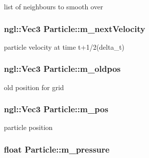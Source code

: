 list of neighbours to smooth over \hypertarget{classParticle_ad27e14ae4bd99b1975413f6881d8aea1}{
\subsubsection[{m\_\-nextVelocity}]{\setlength{\rightskip}{0pt plus 5cm}ngl::Vec3 {\bf Particle::m\_\-nextVelocity}}}
\label{classParticle_ad27e14ae4bd99b1975413f6881d8aea1}


particle velocity at time t+1/2(delta\_\-t) \hypertarget{classParticle_a4dcb620999acae9e32fa55ad39250c57}{
\subsubsection[{m\_\-oldpos}]{\setlength{\rightskip}{0pt plus 5cm}ngl::Vec3 {\bf Particle::m\_\-oldpos}}}
\label{classParticle_a4dcb620999acae9e32fa55ad39250c57}


old position for grid \hypertarget{classParticle_a2b5ef8d7207002ec8e887492a5bbe9f2}{
\subsubsection[{m\_\-pos}]{\setlength{\rightskip}{0pt plus 5cm}ngl::Vec3 {\bf Particle::m\_\-pos}}}
\label{classParticle_a2b5ef8d7207002ec8e887492a5bbe9f2}


particle position \hypertarget{classParticle_a5c0abc7791d1fbfd584e38d509b6088e}{
\subsubsection[{m\_\-pressure}]{\setlength{\rightskip}{0pt plus 5cm}float {\bf Particle::m\_\-pressure}}}
\label{classParticle_a5c0abc7791d1fbfd584e38d509b6088e}



